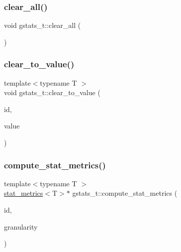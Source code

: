 \mbox{\label{classgstats__t_a5f7327cd91575e8e07c913113e544021}} 
\subsubsection{\texorpdfstring{clear\+\_\+all()}{clear\_all()}}
{\footnotesize\ttfamily void gstats\+\_\+t\+::clear\+\_\+all (\begin{DoxyParamCaption}{ }\end{DoxyParamCaption})\hspace{0.3cm}{\ttfamily [inline]}}

\mbox{\label{classgstats__t_a16f67bb2adcdeccd94669fcbfa86b9ff}} 
\subsubsection{\texorpdfstring{clear\+\_\+to\+\_\+value()}{clear\_to\_value()}}
{\footnotesize\ttfamily template$<$typename T $>$ \\
void gstats\+\_\+t\+::clear\+\_\+to\+\_\+value (\begin{DoxyParamCaption}\item[{\hyperlink{gstats_8h_a662beb90f6d56f5ee9df4d812d39aa33}{gstats\+\_\+stat\+\_\+id}}]{id,  }\item[{T}]{value }\end{DoxyParamCaption})\hspace{0.3cm}{\ttfamily [inline]}}

\mbox{\label{classgstats__t_a9764e6abeef0768a6f992e5e05bb22cc}} 
\subsubsection{\texorpdfstring{compute\+\_\+stat\+\_\+metrics()}{compute\_stat\_metrics()}}
{\footnotesize\ttfamily template$<$typename T $>$ \\
\hyperlink{structgstats__t_1_1stat__metrics}{stat\+\_\+metrics}$<$T$>$$\ast$ gstats\+\_\+t\+::compute\+\_\+stat\+\_\+metrics (\begin{DoxyParamCaption}\item[{const \hyperlink{gstats_8h_a662beb90f6d56f5ee9df4d812d39aa33}{gstats\+\_\+stat\+\_\+id}}]{id,  }\item[{\hyperlink{gstats_8h_a625875e2a7c8582f278735673cfb398c}{gstats\+\_\+enum\+\_\+aggregation\+\_\+granularity}}]{granularity }\end{DoxyParamCaption})\hspace{0.3cm}{\ttfamily [inline]}}

